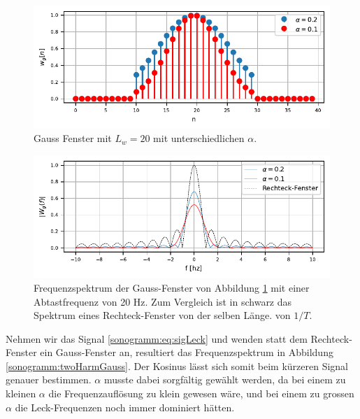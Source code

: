 \begin{figure}
    \centering
    \includegraphics{papers/sonogramm/images/gauss_time.pdf}
    \caption{Gauss Fenster mit $L_w = 20$ mit unterschiedlichen $\alpha$.
    \label{sonogramm:gausstime}
    }
\end{figure}

\begin{figure}
    \centering
    \includegraphics{papers/sonogramm/images/gauss_freq.pdf}
    \caption{Frequenzspektrum der Gauss-Fenster von Abbildung \ref{sonogramm:gausstime}
    mit einer Abtastfrequenz von 20 Hz. Zum Vergleich ist in schwarz das Spektrum eines Rechteck-Fenster 
    von der selben Länge.
    von $1/T$.
    \label{sonogramm:gaussfreq}
    }
\end{figure}

Nehmen wir das Signal \eqref{sonogramm:eq:sigLeck} und wenden statt dem Rechteck-Fenster
ein Gauss-Fenster an, resultiert das Frequenzspektrum in Abbildung \ref{sonogramm:twoHarmGauss}.
Der Kosinus lässt sich somit beim kürzeren Signal genauer bestimmen.
$\alpha$ musste dabei sorgfältig gewählt werden, da bei einem zu kleinen $\alpha$ die 
Frequenzauflösung zu klein gewesen wäre, und bei einem zu grossen $\alpha$ die Leck-Frequenzen
noch immer dominiert hätten.

